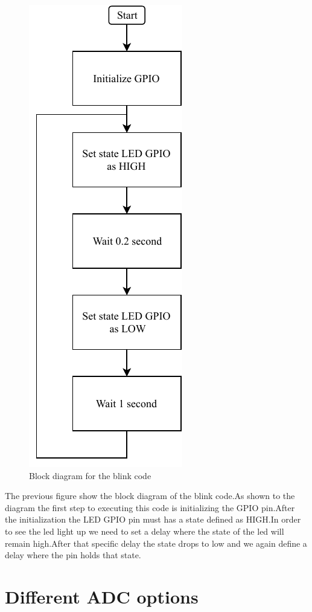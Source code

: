 \documentclass[a4paper, 11pt, openany, oneside, english]{book}
\begin{document}
\begin{figure}[!ht]
\centering
\includegraphics{mbed_blink_diag.pdf}
\caption{Block diagram for the blink code}
\end{figure}

\newpage
The previous figure show the block diagram of the blink code.As shown to the diagram the first step to executing this code is initializing the GPIO pin.After the initialization the LED GPIO pin must has a state defined as HIGH.In order to see the led light up we need to set a delay where the state of the led will remain high.After that specific delay the state drops to low and we again define a delay where the pin holds that state.

\chapter{Different ADC options}
\end{document}
